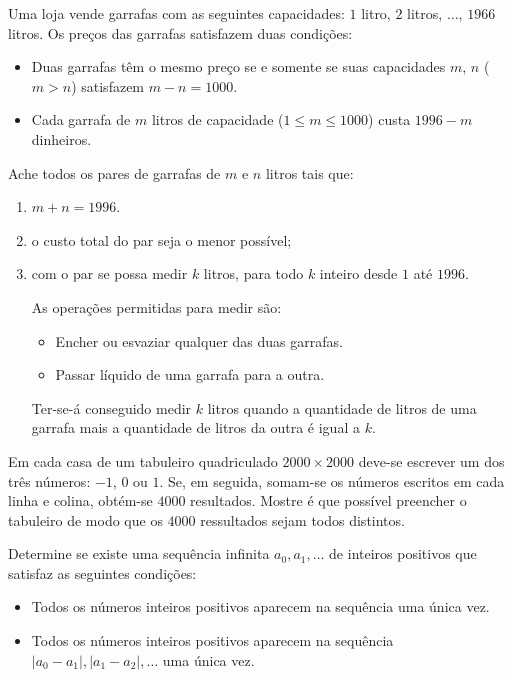 \documentclass[10pt,a4paper]{article}
\begin{document}
	\begin{prob}
		Uma loja vende garrafas com as seguintes capacidades: $1$ litro, $2$ litros, $\dots$, $1966$ litros. Os preços das garrafas satisfazem duas condições:
		\begin{itemize}
			\item Duas garrafas têm o mesmo preço se e somente se suas capacidades $m$, $n$ ($m > n$) satisfazem $m - n = 1000$.
			\item Cada garrafa de $m$ litros de capacidade ($1 \le m \le 1000$) custa $1996 - m$ dinheiros.
		\end{itemize}
		
		Ache todos os pares de garrafas de $m$ e $n$ litros tais que:
		\begin{enumerate}[label = (\alph*)]
			\item $m + n = 1996$.
			\item o custo total do par seja o menor possível;
			\item com o par se possa medir $k$ litros, para todo $k$ inteiro desde $1$ até $1996$.
				\begin{rem}
					As operações permitidas para medir são:
					\begin{itemize}
						\item Encher ou esvaziar qualquer das duas garrafas.
						\item Passar líquido de uma garrafa para a outra.
					\end{itemize}
					Ter-se-á conseguido medir $k$ litros quando a quantidade de litros de uma garrafa mais a quantidade de litros da outra é igual a $k$.
				\end{rem}
		\end{enumerate}
	\end{prob}

	\begin{prob}
		Em cada casa de um tabuleiro quadriculado $2000 \times 2000$ deve-se escrever um dos três números: $-1$, $0$ ou $1$. Se, em seguida, somam-se os números escritos em cada linha e colina, obtém-se $4000$ resultados. Mostre é que possível preencher o tabuleiro de modo que os $4000$ ressultados sejam todos distintos. 
	\end{prob}

	\begin{prob}
		Determine se existe uma sequência infinita $a_0, a_1, \dots$ de inteiros positivos que satisfaz as seguintes condições:
		\begin{itemize}
			\item Todos os números inteiros positivos aparecem na sequência uma única vez.
			\item Todos os números inteiros positivos aparecem na sequência $|a_0 - a_1|, |a_1 - a_2|, \dots$ uma única vez.	
		\end{itemize}
	\end{prob}
\end{document}
